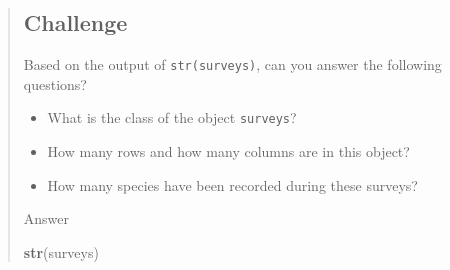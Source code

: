 \documentclass[]{book}
\newenvironment{Shaded}{\begin{snugshade}}{\end{snugshade}}
\newcommand{\KeywordTok}[1]{\textcolor[rgb]{0.13,0.29,0.53}{\textbf{#1}}}
\newcommand{\NormalTok}[1]{#1}
\providecommand{\tightlist}{%
  \setlength{\itemsep}{0pt}\setlength{\parskip}{0pt}}
\begin{document}
\begin{quote}
\subsection{Challenge}\label{challenge-3}

Based on the output of \texttt{str(surveys)}, can you answer the
following questions?

\begin{itemize}
\tightlist
\item
  What is the class of the object \texttt{surveys}?
\item
  How many rows and how many columns are in this object?
\item
  How many species have been recorded during these surveys?
\end{itemize}

Answer

\begin{Shaded}
\begin{Highlighting}[]
\KeywordTok{str}\NormalTok{(surveys)}
\end{Highlighting}
\end{Shaded}


\end{quote}
\end{document}
